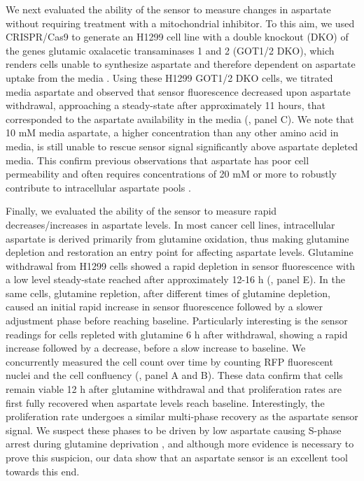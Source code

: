 \documentclass[9pt,lineno]{elife}
\begin{document}
We next evaluated the ability of the sensor to measure changes in aspartate without requiring treatment with a mitochondrial inhibitor.
To this aim, we used CRISPR/Cas9 to generate an H1299 cell line with a double knockout (DKO) of the genes glutamic oxalacetic transaminases 1 and 2 (GOT1/2 DKO), which renders cells unable to synthesize aspartate and therefore dependent on aspartate uptake from the media \citep{Garcia-Bermudez2022-qn}.
Using these H1299 GOT1/2 DKO cells, we titrated media aspartate and observed that sensor fluorescence decreased upon aspartate withdrawal, approaching a steady-state after approximately 11 hours, that corresponded to the aspartate availability in the media (, panel C).
We note that 10 mM media aspartate, a higher concentration than any other amino acid in media, is still unable to rescue sensor signal significantly above aspartate depleted media.
This confirm previous observations that aspartate has poor cell permeability and often requires concentrations of 20 mM or more to robustly contribute to intracellular aspartate pools \citep{Sullivan2018-gz}.

Finally, we evaluated the ability of the sensor to measure rapid decreases/increases in aspartate levels.
In most cancer cell lines, intracellular aspartate is derived primarily from glutamine oxidation, thus making glutamine depletion and restoration an entry point for affecting aspartate levels.
Glutamine withdrawal from H1299 cells showed a rapid depletion in sensor fluorescence with a low level steady-state reached after approximately 12-16 h (, panel E).
In the same cells, glutamine repletion, after different times of glutamine depletion, caused an initial rapid increase in sensor fluorescence followed by a slower adjustment phase before reaching baseline.
Particularly interesting is the sensor readings for cells repleted with glutamine 6 h after withdrawal, showing a rapid increase followed by a decrease, before a slow increase to baseline.
We concurrently measured the cell count over time by counting RFP fluorescent nuclei and the cell confluency (, panel A and B).
These data confirm that cells remain viable 12 h after glutamine withdrawal and that proliferation rates are first fully recovered when aspartate levels reach baseline.
Interestingly, the proliferation rate undergoes a similar multi-phase recovery as the aspartate sensor signal.
We suspect these phases to be driven by low aspartate causing S-phase arrest during glutamine deprivation \citep{Patel2016-ms}, and although more evidence is necessary to prove this suspicion, our data show that an aspartate sensor is an excellent tool towards this end.
\end{document}
